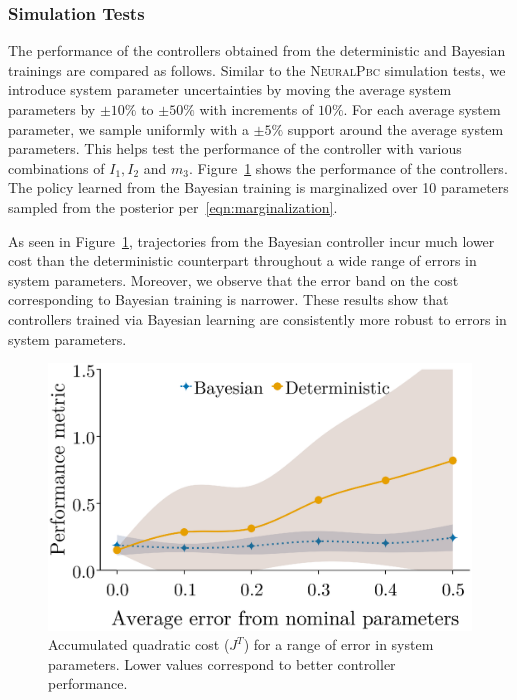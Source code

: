 \subsubsection{Simulation Tests} 
The performance of the controllers obtained from the deterministic and Bayesian
trainings are compared as follows.
%
%
Similar to the \textsc{NeuralPbc} simulation tests, we introduce system
parameter uncertainties by moving the average system parameters by $\pm
10\%$ to $\pm 50\%$ with increments of $10\%$. 
%
For each average system parameter, we sample uniformly with a $\pm 5\%$ support
around the average system parameters. 
%
This helps test the performance of the controller with various combinations of
$I_1, I_2$ and $m_3$.
%
%
%
Figure~\ref{fig:comparison_idapbc} shows the performance of the controllers.
The policy learned from the Bayesian training is marginalized over 10
parameters sampled from the posterior per~\eqref{eqn:marginalization}.

As seen in Figure~\ref{fig:comparison_idapbc}, trajectories from the Bayesian
controller incur much lower cost than the deterministic counterpart throughout a
wide range of errors in system parameters.
%
Moreover, we observe that the error band on the cost corresponding to Bayesian
training is narrower.
%
These results show that controllers trained via Bayesian learning are
consistently more robust to errors in system parameters.
\begin{figure}[tb]
    \centering
    \includegraphics[clip,width=0.7\columnwidth]{./figures/bandplot1.eps}%
    \caption{
        Accumulated quadratic cost ($J^T$) for a range of error in system
        parameters. 
        Lower values correspond to better controller performance.
    }
    \label{fig:comparison_idapbc}
\end{figure}

